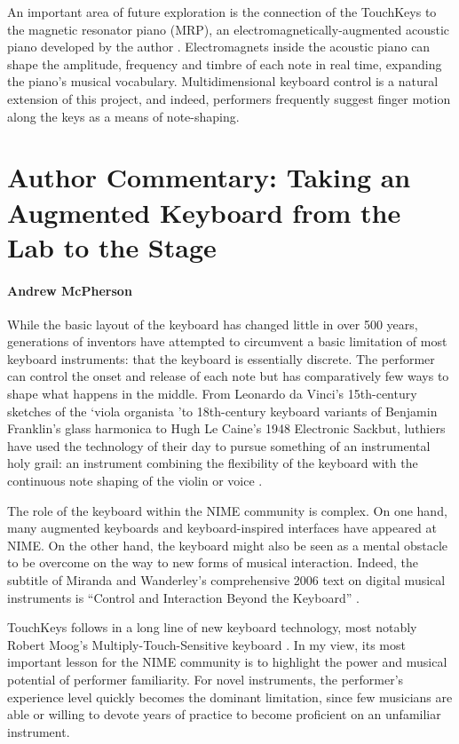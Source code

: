 An important area of future exploration is the connection of the TouchKeys to the magnetic resonator piano (MRP), an electromagnetically-augmented acoustic piano developed by the author \cite{McPherson:2010}. Electromagnets inside the acoustic piano can shape the amplitude, frequency and timbre of each note in real time, expanding the piano's musical vocabulary. Multidimensional keyboard control is a natural extension of this project, and indeed, performers frequently suggest finger motion along the keys as a means of note-shaping.

\section*{Author Commentary: Taking an Augmented Keyboard from the Lab to the Stage}
\paragraph{Andrew McPherson}

While the basic layout of the keyboard has changed little in over 500 years, generations of inventors have attempted to circumvent a basic limitation of most keyboard instruments: that the keyboard is essentially discrete. The performer can control the onset and release of each note but has comparatively few ways to shape what happens in the middle. From Leonardo da Vinci's 15th-century sketches of the \lq viola organista \rq to 18th-century keyboard variants of Benjamin Franklin's glass harmonica to Hugh Le Caine's 1948 Electronic Sackbut, luthiers have used the technology of their day to pursue something of an instrumental holy grail: an instrument combining the flexibility of the keyboard with the continuous note shaping of the violin or voice \cite{McPherson:2015a}.

The role of the keyboard within the NIME community is complex. On one hand, many augmented keyboards and keyboard-inspired interfaces have appeared at NIME. On the other hand, the keyboard might also be seen as a mental obstacle to be overcome on the way to new forms of musical interaction. Indeed, the subtitle of Miranda and Wanderley's comprehensive 2006 text on digital musical instruments is ``Control and Interaction Beyond the Keyboard'' \cite{Miranda:2006}.

TouchKeys follows in a long line of new keyboard technology, most notably Robert Moog's Multiply-Touch-Sensitive keyboard \cite{Moog:1990}. In my view, its most important lesson for the NIME community is to highlight the power and musical potential of performer familiarity. For novel instruments, the performer's experience level quickly becomes the dominant limitation, since few musicians are able or willing to devote years of practice to become proficient on an unfamiliar instrument.

